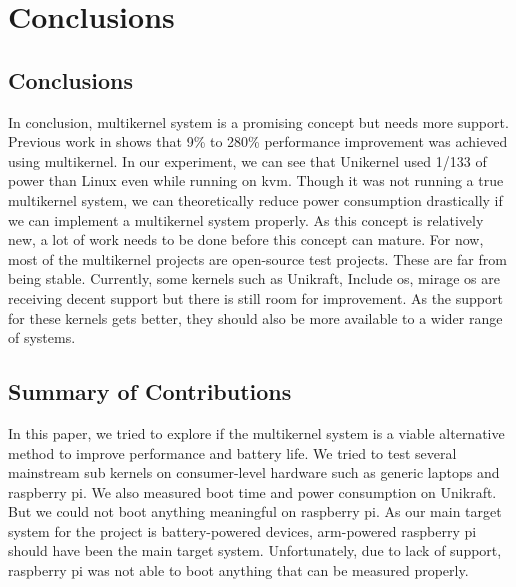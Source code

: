 \documentclass[11pt]{article}       %
\begin{document}
\section{Conclusions} \label{concl}


\subsection{Conclusions} 
In conclusion, multikernel system is a promising concept but needs more support. Previous work in \cite{DEL01} shows that 9\% to 280\% performance improvement was achieved using multikernel. In our experiment, we can see that Unikernel used 1/133 of power than Linux even while running on kvm. Though it was not running a true multikernel system, we can theoretically reduce power consumption drastically if we can implement a multikernel system properly. As this concept is relatively new, a lot of work needs to be done before this concept can mature. For now, most of the multikernel projects are open-source test projects. These are far from being stable. Currently, some kernels such as Unikraft, Include os, mirage os are receiving decent support but there is still room for improvement. As the support for these kernels gets better, they should also be more available to a wider range of systems. 
\subsection{Summary of Contributions}
In this paper, we tried to explore if the multikernel system is a viable alternative method to improve performance and battery life. We tried to test several mainstream sub kernels on consumer-level hardware such as generic laptops and raspberry pi. We also measured boot time and power consumption on Unikraft. But we could not boot anything meaningful on raspberry pi. As our main target system for the project is battery-powered devices, arm-powered raspberry pi should have been the main target system. Unfortunately, due to lack of support, raspberry pi was not able to boot anything that can be measured properly.
\end{document}
